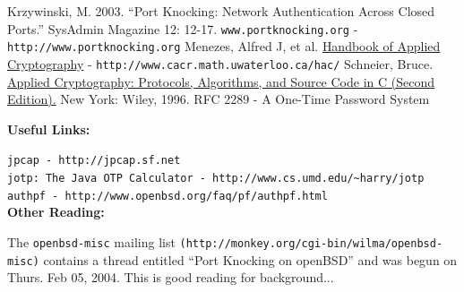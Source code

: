 \documentclass[landscape,twocolumn]{foils}
\begin{document}
\tiny
\begin{thebibliography}{99}
 Krzywinski, M.  2003.  ``Port Knocking: Network Authentication Across Closed Ports.'' SysAdmin Magazine 12: 12-17.
 \texttt{www.portknocking.org} - \verb;http://www.portknocking.org;
 Menezes, Alfred J, et al. \underline{Handbook of Applied Cryptography} - \verb;http://www.cacr.math.uwaterloo.ca/hac/;
 Schneier, Bruce. \underline{Applied Cryptography: Protocols, Algorithms, and Source Code in C (Second Edition).} New York: Wiley, 1996.
 RFC 2289 - A One-Time Password System
\end{thebibliography}

\large
\textbf{Useful Links:}

\tiny
\verb;jpcap - http://jpcap.sf.net;\\
\verb;jotp: The Java OTP Calculator - http://www.cs.umd.edu/~harry/jotp;\\
\verb;authpf - http://www.openbsd.org/faq/pf/authpf.html;\\

\large
\textbf{Other Reading:}

\tiny
The \texttt{openbsd-misc} mailing list \verb;(http://monkey.org/cgi-bin/wilma/openbsd-misc);  contains a thread entitled ``Port Knocking on openBSD'' and was begun on Thurs. Feb 05, 2004.  This is good reading for background...
\end{document}
